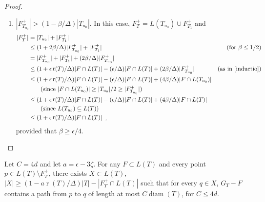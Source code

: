 \documentclass{patmorin}
\DeclareMathOperator{\rank}{r}
\DeclareMathOperator{\diam}{diam}
\begin{document}
\begin{proof}
\begin{enumerate}
\begin{enumerate}
       \item $|F^+_{T_{u_0}}| > (1-\beta/\Delta)|T_{u_0}|$. In this case, $F^+_T=L(T_{u_0}) \cup F^+_{T_1}$ and
       \begin{align*}
          |F^+_T| 
            & = |T_{u_0}| + |F^+_{T_1}| \\
            & \le (1+2\beta/\Delta)|F^+_{T_{u_0}}| + |F^+_{T_1}|
              & \text{(for $\beta\le 1/2$)}\\
            & = |F^+_{T_{u_0}}| + |F^+_{T_1}| + (2\beta/\Delta)|F^+_{T_{u_0}}| \\
            & \le (1+\epsilon\rank(T)/\Delta)|F\cap L(T)| - (\epsilon/\Delta)|F\cap L(T)| + (2\beta/\Delta)|F^+_{T_{u_0}}| 
             & \text{(as in \eqref{inductio})} \\
            & \le (1+\epsilon\rank(T)/\Delta)|F\cap L(T)| - (\epsilon/\Delta)|F\cap L(T)| + (4\beta/\Delta)|F\cap L(T_{u_0})|  \\
              & \qquad \text{(since $|F\cap L(T_{u_0})|\ge |T_{u_0}|/2 \ge |F^+_{T_{u_0}}|$)}\\
            & \le (1+\epsilon\rank(T)/\Delta)|F\cap L(T)| - (\epsilon/\Delta)|F\cap L(T)| + (4\beta/\Delta)|F\cap L(T)| \\
              & \qquad \text{(since $L(T_{u_0})\subseteq L(T)$)} \\
            & \le (1+\epsilon\rank(T)/\Delta)|F\cap L(T)| \enspace ,
       \end{align*}
       provided that $\beta \ge \epsilon/4$. \qedhere
     \end{enumerate}
   \end{enumerate}
\end{proof}


\begin{clm}
  Let $C=4d$ and let $a=\epsilon-3\zeta$.
  For any $F\subset L(T)$ and every point $p\in L(T)\setminus F^+_T$,
  there exists $X\subset L(T)$, $|X|\ge (1-a\rank(T)/\Delta)|T|-|F^+_T\cap
  L(T)|$ such that for every $q\in X$, $G_T-F$ contains a path from $p$
  to $q$ of length at most $C\diam(T)$, for $C\le 4d$.
\end{clm}
\end{document}
